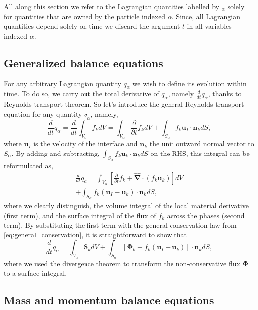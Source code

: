 \documentclass[twocolumn]{My_article}
\newcommand{\nablabh}{\hat{\bm{\nabla}}}
\newcommand{\ddt}{\frac{d}{d t}}
\newcommand{\pddt}{\frac{\partial}{\partial t}}
\begin{document}
All along this section we refer to the Lagrangian quantities labelled by $_\alpha$ solely for quantities that are owned by the particle indexed $\alpha$.
Since, all Lagrangian quantities depend solely on time we discard the argument $t$ in all variables indexed $\alpha$.

\subsection{Generalized balance equations}

For any arbitrary Lagrangian quantity $q_\alpha$ we wish to define its evolution within time.
To do so, we carry out the total derivative of $q_\alpha$, namely $\ddt q_\alpha$, thanks to Reynolds transport theorem.
So let's introduce the general Reynolds transport equation for any quantity $q_\alpha$, namely,
\begin{equation*}
    \ddt  q_\alpha
    = \ddt \int_{V_\alpha} f_k dV
    = \int_{V_\alpha} \pddt f_kdV
    + \int_{S_\alpha} f_k \textbf{u}_I \cdot \textbf{n}_k d S,
\end{equation*}
where $\textbf{u}_I$ is the velocity of the interface and $\textbf{n}_k$ the unit outward normal vector to $S_\alpha$.
By adding and subtracting, $\int_{S_\alpha} f_k \textbf{u}_k\cdot \textbf{n}_k dS$ on the RHS,  this integral can be reformulated as,
\begin{multline}
    \ddt  q_\alpha
    = \int_{V_\alpha}\left[ \pddt f_k + \nablabh \cdot\left(f_k\textbf{u}_k\right) \right]dV\\
    + \int_{S_\alpha} f_k (\textbf{u}_I-\textbf{u}_k)\cdot \textbf{n}_k d S,
    \label{eq:q_alpha_dt}
\end{multline}
where we clearly distinguish, the volume integral of the local material derivative (first term), and the surface integral of the flux of $f_k$ across the phases (second term).
By substituting the first term with the general conservation law from \ref{eq:general_conservation}, it is straightforward to show that
\begin{equation}
    \ddt  q_\alpha
    = \int_{V_\alpha} \textbf{S}_k dV
    + \int_{S_\alpha} \left[\bm{\Phi}_k + f_k (\textbf{u}_I-\textbf{u}_k) \right] \cdot \textbf{n}_k d S,
    \label{eq:q_alpha_balance}
\end{equation}
where we used the divergence theorem to transform the non-conservative flux $\bm{\Phi}$ to a surface integral.

\subsection{Mass and momentum balance equations}
\end{document}
